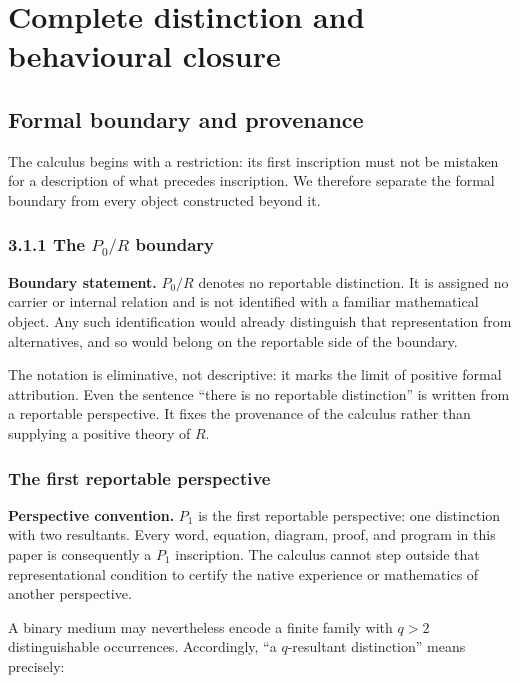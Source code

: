\documentclass[11pt,a4paper]{article}
\begin{document}
\section{Complete distinction and behavioural
closure}

\subsection{Formal boundary and
provenance}

The calculus begins with a restriction: its first inscription must not
be mistaken for a description of what precedes inscription. We therefore
separate the formal boundary from every object constructed beyond it.

\subsubsection{\texorpdfstring{3.1.1 The \(P_{0}/R\)
boundary}{3.1.1 The P\_\{0\}/R boundary}}

\textbf{Boundary statement.} \(P_{0}/R\) denotes no reportable
distinction. It is assigned no carrier or internal relation and is not
identified with a familiar mathematical object. Any such identification
would already distinguish that representation from alternatives, and so
would belong on the reportable side of the boundary.

The notation is eliminative, not descriptive: it marks the limit of
positive formal attribution. Even the sentence ``there is no reportable
distinction'' is written from a reportable perspective. It fixes the
provenance of the calculus rather than supplying a positive theory of
\(R\).

\subsubsection{The first reportable
perspective}

\textbf{Perspective convention.} \(P_{1}\) is the first reportable
perspective: one distinction with two resultants. Every word, equation,
diagram, proof, and program in this paper is consequently a \(P_{1}\)
inscription. The calculus cannot step outside that representational
condition to certify the native experience or mathematics of another
perspective.

A binary medium may nevertheless encode a finite family with \(q > 2\)
distinguishable occurrences. Accordingly, ``a \(q\)-resultant
distinction'' means precisely:
\end{document}
